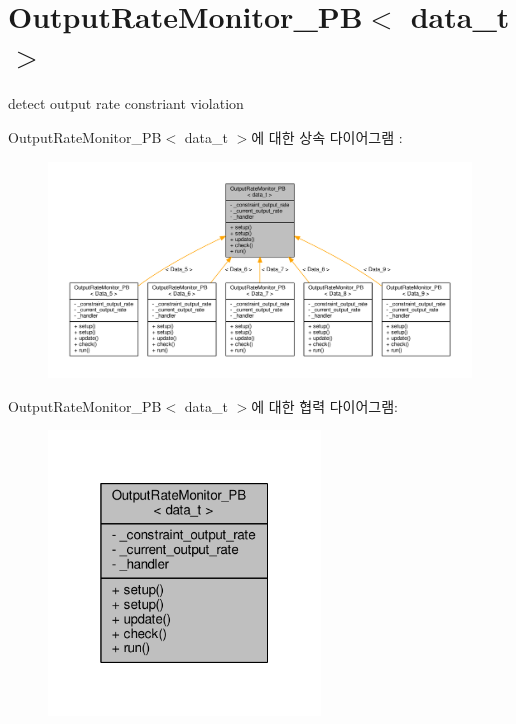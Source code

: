 \hypertarget{classOutputRateMonitor__PB}{}\section{Output\+Rate\+Monitor\+\_\+\+PB$<$ data\+\_\+t $>$}
\label{classOutputRateMonitor__PB}


detect output rate constriant violation  




Output\+Rate\+Monitor\+\_\+\+PB$<$ data\+\_\+t $>$에 대한 상속 다이어그램 \+: \nopagebreak
\begin{figure}[H]
\begin{center}
\leavevmode
\includegraphics[width=350pt]{classOutputRateMonitor__PB__inherit__graph}
\end{center}
\end{figure}


Output\+Rate\+Monitor\+\_\+\+PB$<$ data\+\_\+t $>$에 대한 협력 다이어그램\+:\nopagebreak
\begin{figure}[H]
\begin{center}
\leavevmode
\includegraphics[width=205pt]{classOutputRateMonitor__PB__coll__graph}
\end{center}
\end{figure}
